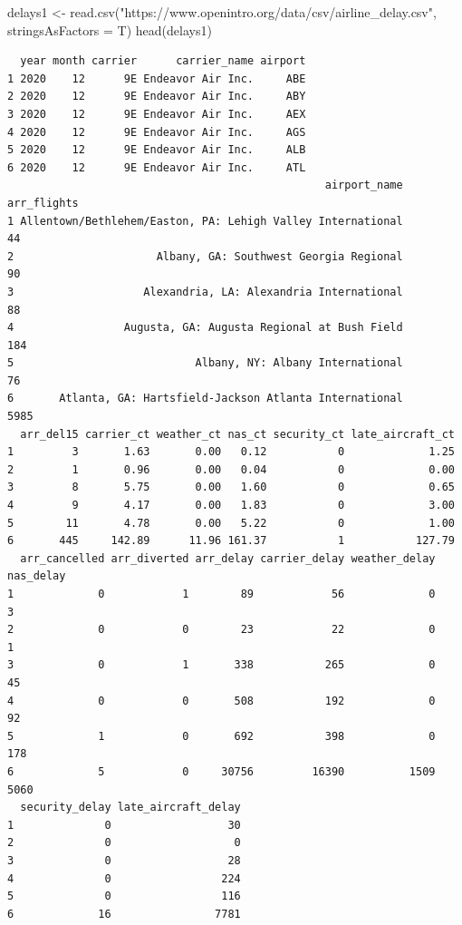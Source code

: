 \documentclass[
  letterpaper,
  DIV=11,
  numbers=noendperiod]{scrreprt}
\newenvironment{Shaded}{\begin{snugshade}}{\end{snugshade}}
\newcommand{\AttributeTok}[1]{\textcolor[rgb]{0.40,0.45,0.13}{#1}}
\newcommand{\FunctionTok}[1]{\textcolor[rgb]{0.28,0.35,0.67}{#1}}
\newcommand{\NormalTok}[1]{\textcolor[rgb]{0.00,0.23,0.31}{#1}}
\newcommand{\OtherTok}[1]{\textcolor[rgb]{0.00,0.23,0.31}{#1}}
\newcommand{\StringTok}[1]{\textcolor[rgb]{0.13,0.47,0.30}{#1}}
\begin{document}
\begin{Shaded}
\begin{Highlighting}[]
\NormalTok{delays1 }\OtherTok{\textless{}{-}} \FunctionTok{read.csv}\NormalTok{(}\StringTok{"https://www.openintro.org/data/csv/airline\_delay.csv"}\NormalTok{, }\AttributeTok{stringsAsFactors =}\NormalTok{ T)}
\FunctionTok{head}\NormalTok{(delays1)}
\end{Highlighting}
\end{Shaded}

\begin{verbatim}
  year month carrier      carrier_name airport
1 2020    12      9E Endeavor Air Inc.     ABE
2 2020    12      9E Endeavor Air Inc.     ABY
3 2020    12      9E Endeavor Air Inc.     AEX
4 2020    12      9E Endeavor Air Inc.     AGS
5 2020    12      9E Endeavor Air Inc.     ALB
6 2020    12      9E Endeavor Air Inc.     ATL
                                                 airport_name arr_flights
1 Allentown/Bethlehem/Easton, PA: Lehigh Valley International          44
2                      Albany, GA: Southwest Georgia Regional          90
3                    Alexandria, LA: Alexandria International          88
4                 Augusta, GA: Augusta Regional at Bush Field         184
5                            Albany, NY: Albany International          76
6       Atlanta, GA: Hartsfield-Jackson Atlanta International        5985
  arr_del15 carrier_ct weather_ct nas_ct security_ct late_aircraft_ct
1         3       1.63       0.00   0.12           0             1.25
2         1       0.96       0.00   0.04           0             0.00
3         8       5.75       0.00   1.60           0             0.65
4         9       4.17       0.00   1.83           0             3.00
5        11       4.78       0.00   5.22           0             1.00
6       445     142.89      11.96 161.37           1           127.79
  arr_cancelled arr_diverted arr_delay carrier_delay weather_delay nas_delay
1             0            1        89            56             0         3
2             0            0        23            22             0         1
3             0            1       338           265             0        45
4             0            0       508           192             0        92
5             1            0       692           398             0       178
6             5            0     30756         16390          1509      5060
  security_delay late_aircraft_delay
1              0                  30
2              0                   0
3              0                  28
4              0                 224
5              0                 116
6             16                7781
\end{verbatim}
\end{document}
